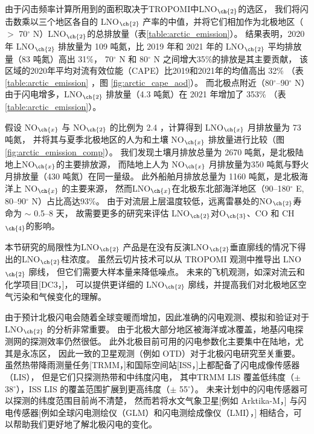 由于闪击频率计算所用到的面积取决于TROPOMI中LNO$_{\ch{2}}$的选区，
我们将闪击数乘以三个地区各自的 LNO$_{\ch{2}}$ 产率的中值，并将它们相加作为北极地区（$>$ 70$^{\circ}$ N）LNO$_{\ch{2}}$的总排放量（表\ref{table:arctic_emission}）。
结果表明，2020 年 LNO$_{\ch{2}}$ 排放量为 109 吨氮，比 2019 年和 2021 年的 LNO$_{\ch{2}}$ 平均排放量（83 吨氮）高出 31\%，
70$^{\circ}$ N 和 80$^{\circ}$ N 之间增大35\%的排放是其主要贡献，
该区域的2020年平均对流有效位能（CAPE）比2019和2021年的均值高出 32\%
（表\ref{table:arctic_emission} ，图 \ref{fig:arctic_cape_aod}）。
而北极点附近（80$^{\circ}$--90$^{\circ}$ N）由于闪电增多，LNO$_{\ch{2}}$ 排放量（4.3 吨氮）在 2021 年增加了 353\% （表 \ref{table:arctic_emission}）。

假设 NO$_{\ch{x}}$ 与 NO$_{\ch{2}}$ 的比例为 2.4 \citep{Silvern.2018}，计算得到 LNO$_{\ch{x}}$ 月排放量为 73 吨氮，
并将其与夏季北极地区的人为和土壤 NO$_{\ch{x}}$ 排放量进行比较（图\ref{fig:arctic_emission_comp}）。
我们发现土壤月排放总量为 2670 吨氮，是北极陆地上NO$_{\ch{x}}$的主要排放源，
而陆地上人为 NO$_{\ch{x}}$ 月排放量为350 吨氮与野火月排放量（430 吨氮）在同一量级。
此外船舶月排放总量为 1160 吨氮，是北极海洋上 NO$_{\ch{x}}$ 的主要来源，
然而LNO$_{\ch{x}}$在北极东北部海洋地区（90--180$^{\circ}$ E, 80--90$^{\circ}$ N）占比高达93\%。
由于对流层上层温度较低，远离雷暴处的NO$_{\ch{2}}$寿命为 $\sim$ 0.5--8 天\citep{Schumann.2007,Nault.2017}，
故需要更多的研究来评估 LNO$_{\ch{2}}$对O$_{\ch{3}}$、CO 和 CH$_{\ch{4}}$的影响。


本节研究的局限性为LNO$_{\ch{2}}$ 产品是在没有反演LNO$_{\ch{2}}$垂直廓线的情况下得出的LNO$_{\ch{2}}$柱浓度。
虽然云切片技术\citep{BelmonteRivas.2015,Marais.2021}可以从 TROPOMI 观测中推导出 LNO$_{\ch{2}}$ 廓线，
但它们需要大样本量来降低噪点。
未来的飞机观测，如深对流云和化学项目[DC3，\citet{Barth.2019}]，
可以提供更详细的 LNO$_{\ch{2}}$ 廓线，并提高我们对北极地区空气污染和气候变化的理解\citep{Law.2007,Schmale.2018}。

由于预计北极闪电会随着全球变暖而增加，因此准确的闪电观测、模拟和验证对于 LNO$_{\ch{2}}$ 的分析非常重要。
由于北极大部分地区被海洋或冰覆盖，地基闪电探测网的探测效率仍然很低\citep{Vagasky.2022}。
此外北极目前可用的闪电参数化主要集中在陆地，尤其是永冻区\citep{Chen.2021a}，
因此一致的卫星观测（例如 OTD）对于北极闪电研究至关重要。
虽然热带降雨测量任务[TRMM，\citet{Cecil.2014}]和国际空间站[ISS，\citet{Blakeslee.2020}]上都配备了闪电成像传感器（LIS），
但是它们只探测热带和中纬度闪电，
其中TRMM LIS 覆盖低纬度（$\pm$ 38$^{\circ}$），ISS LIS 的覆盖范围扩展到更高纬度（$\pm$ 55$^{\circ}$）。
未来计划中的闪电传感器可以探测的纬度范围目前尚不清楚，
然而若将水文气象卫星[例如 Arktika-M，\citet{Asmus.2021}]
与闪电传感器[例如全球闪电测绘仪（GLM）和闪电测绘成像仪（LMI），\citet{Goodman.2013,Yang.2017}] 相结合，可以帮助我们更好地了解北极闪电的变化。


